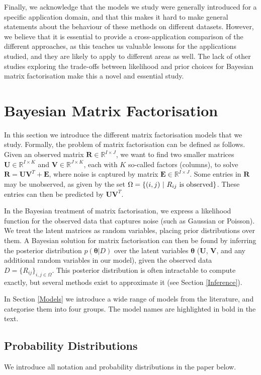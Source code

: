 \documentclass[letterpaper]{article} %
\newcommand{\R}{\boldsymbol R}
\newcommand{\E}{\boldsymbol E}
\newcommand{\U}{\boldsymbol U}
\newcommand{\V}{\boldsymbol V}
\newcommand{\btheta}{\boldsymbol \theta}
\begin{document}
	Finally, we acknowledge that the models we study were generally introduced for a specific application domain, and that this makes it hard to make general statements about the behaviour of these methods on different datasets. However, we believe that it is essential to provide a cross-application comparison of the different approaches, as this teaches us valuable lessons for the applications studied, and they are likely to apply to different areas as well. The lack of other studies exploring the trade-offs between likelihood and prior choices for Bayesian matrix factorisation make this a novel and essential study.
	

\section{Bayesian Matrix Factorisation}
	In this section we introduce the different matrix factorisation models that we study. Formally, the problem of matrix factorisation can be defined as follows. Given an observed matrix $ \R \in \mathbb{R}^{I \times J} $, we want to find two smaller matrices $ \U \in \mathbb{R}^{I \times K} $ and $ \V \in \mathbb{R}^{J \times K} $, each with $K$ so-called factors (columns), to solve $ \R = \U \V^T + \E $, where noise is captured by matrix $ \E \in \mathbb{R}^{I \times J} $. Some entries in $\R$ may be unobserved, as given by the set $ \Omega = \left\{ (i,j) \text{ $ \vert $ $ R_{ij} $ is observed} \right\} $. These entries can then be predicted by $\U \V^T$.
	
	In the Bayesian treatment of matrix factorisation, we express a likelihood function for the observed data that captures noise (such as Gaussian or Poisson). We treat the latent matrices as random variables, placing prior distributions over them. A Bayesian solution for matrix factorisation can then be found by inferring the posterior distribution $p(\btheta|D)$ over the latent variables $\btheta$ ($\U$, $\V$, and any additional random variables in our model), given the observed data $ D = \lbrace R_{ij} \rbrace_{i,j \in \Omega} $. This posterior distribution is often intractable to compute exactly, but several methods exist to approximate it (see Section \ref{Inference}). 
	
	In Section \ref{Models} we introduce a wide range of models from the literature, and categorise them into four groups. The model names are highlighted in bold in the text.
	
	\subsection{Probability Distributions}
		We introduce all notation and probability distributions in the paper below. 
		
\end{document}
